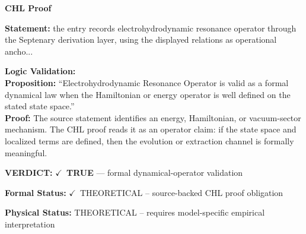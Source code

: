 \vspace{0.45em}
\noindent\textbf{CHL Proof}\par
\textbf{Statement:} the entry records electrohydrodynamic resonance operator through the Septenary
derivation layer, using the displayed relations as operational ancho...

\textbf{Logic Validation:}\\
\textbf{Proposition:} ``Electrohydrodynamic Resonance Operator is valid as a formal dynamical law when the
Hamiltonian or energy operator is well defined on the stated state space.''\\
\textbf{Proof:} The source statement identifies an energy, Hamiltonian, or vacuum-sector mechanism. The
CHL proof reads it as an operator claim: if the state space and localized terms are
defined, then the evolution or extraction channel is formally meaningful.

\textbf{VERDICT:} \ensuremath{\checkmark}\ \textbf{TRUE} --- formal dynamical-operator validation

\textbf{Formal Status:} \ensuremath{\checkmark}\ THEORETICAL -- source-backed CHL proof obligation

\textbf{Physical Status:} THEORETICAL -- requires model-specific empirical interpretation
\par\vspace{0.45em}
\par
\ifTZPDarkEdition
{}
\fi
\endgroup
\endgroup
